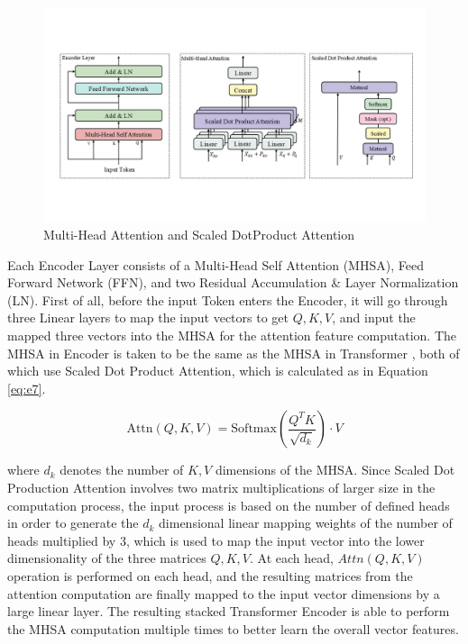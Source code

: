 \documentclass{article}
\begin{document}
\begin{figure}[htbp]
	\centering
	\includegraphics[scale=0.45]{figure/p4.jpg}
	\caption{Multi-Head Attention and Scaled DotProduct Attention}\label{fig:p4}
\end{figure}

Each Encoder Layer consists of a Multi-Head Self Attention (MHSA), Feed Forward Network (FFN), and two Residual Accumulation \& Layer Normalization (LN). First of all, before the input Token enters the Encoder, it will go through three Linear layers to map the input vectors to get $Q,K,V$, and input the mapped three vectors into the MHSA for the attention feature computation. The MHSA in Encoder is taken to be the same as the MHSA in Transformer \cite{13}, both of which use Scaled Dot Product Attention, which is calculated as in Equation \ref{eq:e7}.

\begin{equation}\label{eq:e7}
	\mbox{Attn}(Q,K,V)=\mbox{Softmax}(\frac{Q^T K}{\sqrt{d_k }})\cdot V
\end{equation}


where $d_k$ denotes the number of $K,V$ dimensions of the MHSA. Since Scaled Dot Production Attention involves two matrix multiplications of larger size in the computation process, the input process is based on the number of defined heads in order to generate the $d_k$ dimensional linear mapping weights of the number of heads multiplied by 3, which is used to map the input vector into the lower dimensionality of the three matrices $Q,K,V$. At each head, $Attn(Q,K,V ) $operation is performed on each head, and the resulting matrices from the attention computation are finally mapped to the input vector dimensions by a large linear layer. The resulting stacked Transformer Encoder is able to perform the MHSA computation multiple times to better learn the overall vector features.
\end{document}
